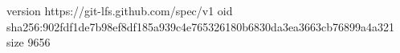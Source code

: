 version https://git-lfs.github.com/spec/v1
oid sha256:902fdf1de7b98ef8df185a939c4e765326180b6830da3ea3663cb76899a4a321
size 9656
